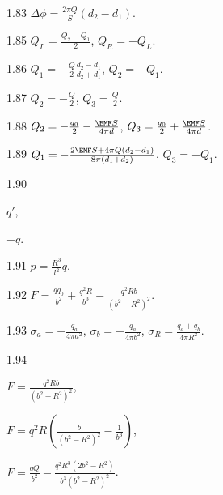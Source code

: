 \begin{Solution}{1.{83}}
	$\Delta\phi = \frac{2\pi Q}{S} (d_2 - d_1)$.
\end{Solution}
\begin{Solution}{1.{85}}
	$Q_{L} = \frac{Q_2 - Q_1}{2}$, $Q_{R} = -Q_{L}$.
\end{Solution}
\begin{Solution}{1.{86}}
	$Q_1 = -\frac{Q}{2}\frac{d_2 - d_1}{d_2 + d_1}$, $Q_2 = - Q_1$.
\end{Solution}
\begin{Solution}{1.{87}}
	$Q_2 = -\frac{Q}{2}$, $Q_3 = \frac{Q}{2}$.
\end{Solution}
\begin{Solution}{1.{88}}
	$Q_2 = -\frac{q_0}{2} -\frac{\EMF S}{4\pi d}$, $Q_3 = \frac{q_0}{2} + \frac{\EMF S}{4\pi d}$.
\end{Solution}
\begin{Solution}{1.{89}}
	$Q_1 = -\frac{2\EMF S + 4\pi Q(d_2 - d_1)}{8\pi(d_1 + d_2)}$, $Q_3 = -Q_1$.
\end{Solution}
\begin{Solution}{1.{90}}
	\begin{enumerate*}[label=\alph*)]
	\item  $q'$,
	\item  $-q$.
	\end{enumerate*}
\end{Solution}
\begin{Solution}{1.{91}}
		$p = \frac{R^3}{l^2} q$.
	
\end{Solution}
\begin{Solution}{1.{92}}
	$ F =  \frac{qq_0}{b^2} + \frac{q^2 R}{b^3} - \frac{q^2 Rb}{(b^2 - R^2)^2}$.
\end{Solution}
\begin{Solution}{1.{93}}
	$\sigma_a = -\frac{q_a}{4\pi a^2}$, $\sigma_b = -\frac{q_a}{4\pi b^2}$, $\sigma_R = \frac{q_a + q_b}{4\pi R^2}$.
\end{Solution}
\begin{Solution}{1.{94}}
	\begin{enumerate*}[label=\alph*)]
		\item $F = \frac{q^2Rb}{(b^2-R^2)^2} $,
		\item $F = q^2R\left( \frac{b}{(b^2-R^2)^2} - \frac{1}{b^3}\right)$,
		\item $F = \frac{qQ}{b^2} - \frac{q^2R^3(2b^2 - R^2)}{b^3(b^2 - R^2)^2}$.
	\end{enumerate*}
\end{Solution}
